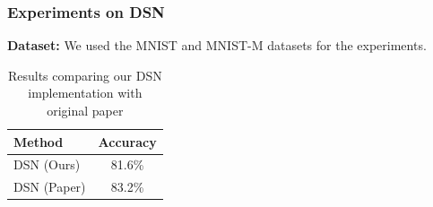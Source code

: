 \documentclass{beamer}
\begin{document}
    


\begin{frame}
    \frametitle{Experiments on DSN}
    \textbf{Dataset:} We used the MNIST and MNIST-M datasets for the experiments.\\

    \begin{table}[h]
        \centering
        \begin{tabular}{lc}
        \toprule
        \textbf{Method} & \textbf{Accuracy} \\
        \midrule
        DSN (Ours) & 81.6\% \\
        DSN (Paper) & 83.2\% \\
        \bottomrule
      \end{tabular}
      \caption{Results comparing our DSN implementation with original paper}
    \end{table}


    

\end{frame}
\end{document}
